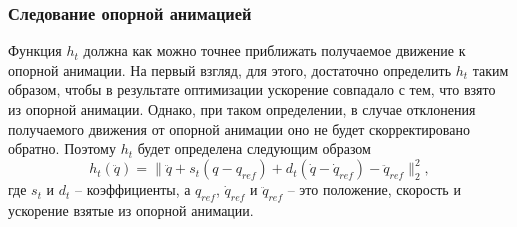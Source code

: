 










\subsubsection{Следование опорной анимацией}


Функция $h_{t}$ должна как можно точнее приближать получаемое движение к опорной анимации. На первый взгляд, для этого, достаточно определить $h_{t}$ таким образом, чтобы в результате оптимизации ускорение совпадало с тем, что взято из опорной анимации. Однако, при таком определении, в случае отклонения получаемого движения от опорной анимации оно не будет скорректировано обратно. Поэтому $h_{t}$ будет определена следующим образом
\begin{equation*}
  h_{t}(\ddot{q}) = \lVert \ddot{q} + s_{t} (q - q_{ref}) + d_{t} (\dot{q} - \dot{q}_{ref}) - \ddot{q}_{ref} \rVert_{2}^{2},
\end{equation*}
где $s_{t}$ и $d_{t}$ -- коэффициенты, а $q_{ref}$, $\dot{q}_{ref}$ и $\ddot{q}_{ref}$ -- это положение, скорость и ускорение взятые из опорной анимации.

